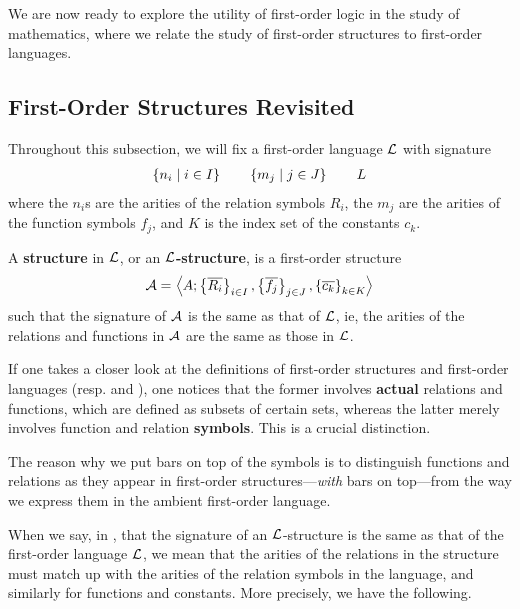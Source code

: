 We are now ready to explore the utility of first-order logic in the study of mathematics, where we relate the study of first-order structures to first-order languages.

\subsection{First-Order Structures Revisited}

Throughout this subsection, we will fix a first-order language $\mathcal{L}$ with signature
\begin{align*}
    \left\{ n_i \; \middle\vert \; i \in I \right\}
    \qquad
    \left\{ m_j \; \middle\vert \; j \in J \right\}
    \qquad
    L
\end{align*}
where the $n_i$s are the arities of the relation symbols $R_i$, the $m_j$ are the arities of the function symbols $f_j$, and $K$ is the index set of the constants $c_k$.

\begin{boxdefinition}\label{Ch2:Def:First-Order_Structure_in_First-Order_Language}
    A \textbf{structure} in $\mathcal{L}$, or an \textbf{$\mathcal{L}$-structure}, is a first-order structure
    \begin{align*}
        \mathcal{A} = \left\langle A; \left\{ \overline{R_i} \right\}_{i \in I}, \left\{ \overline{f_j} \right\}_{j \in J}, \left\{ \overline{c_k} \right\}_{k \in K} \right\rangle
    \end{align*}
    such that the signature of $\mathcal{A}$ is the same as that of $\mathcal{L}$, ie, the arities of the relations and functions in $\mathcal{A}$ are the same as those in $\mathcal{L}$.
\end{boxdefinition}

If one takes a closer look at the definitions of first-order structures and first-order languages (resp.  and ), one notices that the former involves \textbf{actual} relations and functions, which are defined as subsets of certain sets, whereas the latter merely involves function and relation \textbf{symbols}. This is a crucial distinction.

\begin{boxconvention}
    The reason why we put bars on top of the symbols is to distinguish functions and relations as they appear in first-order structures---\textit{with} bars on top---from the way we express them in the ambient first-order language.
\end{boxconvention}

When we say, in , that the signature of an $\mathcal{L}$-structure is the same as that of the first-order language $\mathcal{L}$, we mean that the arities of the relations in the structure must match up with the arities of the relation symbols in the language, and similarly for functions and constants. More precisely, we have the following.

